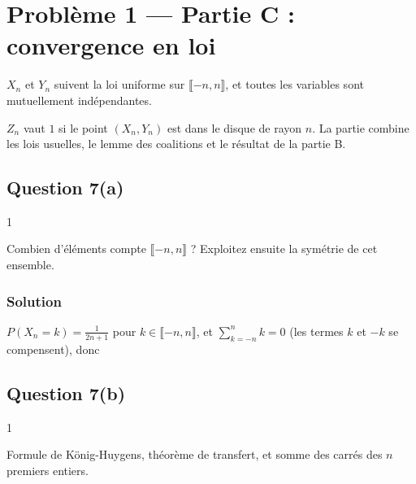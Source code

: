 \documentclass[11pt,a4paper]{article}
\providecommand{\llbracket}{\lBrack}
\providecommand{\rrbracket}{\rBrack}
\newcommand{\equationajustee}[1]{%
  \sbox{\boiteequation}{$\displaystyle #1$}%
  \ifdim\wd\boiteequation>\linewidth
    \[\resizebox{\linewidth}{!}{\usebox{\boiteequation}}\]%
  \else
    \[#1\]%
  \fi}
\begin{document}
\hypertarget{probluxe8me-1-partie-c-convergence-en-loi}{%
\section{Problème 1 --- Partie C : convergence en loi}\label{probluxe8me-1-partie-c-convergence-en-loi}}

\(X_n\) et \(Y_n\) suivent la loi uniforme sur \(\llbracket-n,n\rrbracket\), et toutes les variables sont mutuellement indépendantes.

\(Z_n\) vaut \(1\) si le point \((X_n,Y_n)\) est dans le disque de rayon \(n\). La partie combine les lois usuelles, le lemme des coalitions et le résultat de la partie B.

\hypertarget{question-7a}{%
\subsection{Question 7(a)}\label{question-7a}}

\begin{indication}{1}

Combien d'éléments compte \(\llbracket-n,n\rrbracket\) ? Exploitez ensuite la symétrie de cet ensemble.

\end{indication}

\hypertarget{solution-14}{%
\subsubsection{Solution}\label{solution-14}}

\(P(X_n=k)=\frac1{2n+1}\) pour \(k\in\llbracket-n,n\rrbracket\), et \(\sum_{k=-n}^nk=0\) (les termes \(k\) et \(-k\) se compensent), donc

\equationajustee{\boxed{\begin{aligned}
E(X_n)&=\frac1{2n+1}\sum_{k=-n}^nk\\
&=0.
\end{aligned}}}

\hypertarget{question-7b}{%
\subsection{Question 7(b)}\label{question-7b}}

\begin{indication}{1}

Formule de König-Huygens, théorème de transfert, et somme des carrés des \(n\) premiers entiers.

\end{indication}
\end{document}
